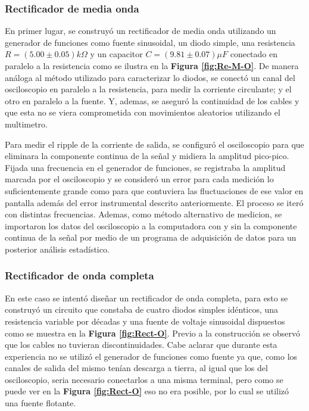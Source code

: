 \documentclass[11pt,a4paper]{article}
\begin{document}
\subsubsection{Rectificador de media onda}
En primer lugar, se construyó un rectificador de media onda utilizando un generador de funciones como fuente sinusoidal, un diodo simple, una resistencia $R = (5.00 \pm 0.05)k\Omega$ y un capacitor $C = (9.81 \pm 0.07)\mu F$ conectado en paralelo a la resistencia como se ilustra en la \textbf{Figura \ref{fig:Re-M-O}}. De manera análoga al método utilizado para caracterizar lo diodos, se conectó un canal del osciloscopio en paralelo a la resistencia, para medir la corriente circulante; y el otro en paralelo a la fuente. Y, ademas, se aseguró la continuidad de los cables y que esta no se viera comprometida con movimientos aleatorios utilizando el multimetro.

Para medir el ripple de la corriente de salida, se configuró el osciloscopio para que eliminara la componente continua de la señal y midiera la amplitud pico-pico. Fijada una frecuencia en el generador de funciones, se registraba la amplitud marcada por el osciloscopio y se consideró un error para cada medición lo suficientemente grande como para que contuviera las fluctuaciones de ese valor en pantalla además del error instrumental descrito anteriormente. El proceso se iteró con distintas frecuencias.  Ademas, como método alternativo de medicion, se importaron los datos del osciloscopio a la computadora con y sin la componente continua de la señal por medio de un programa de adquisición de datos para un posterior análisis estadístico.

\subsubsection{Rectificador de onda completa}
En este caso se intentó diseñar un rectificador de onda completa, para esto se construyó un circuito que constaba de cuatro diodos simples idénticos, una resistencia variable por décadas y una fuente de voltaje sinusoidal dispuestos como se muestra en la \textbf{Figura \ref{fig:Rect-O}}. Previo a la construcción se observó que los cables no tuvieran discontinuidades. Cabe aclarar que durante esta experiencia no se utilizó el generador de funciones como fuente ya que, como los canales de salida del mismo tenían descarga a tierra, al igual que los del osciloscopio, seria necesario conectarlos a una misma terminal, pero como se puede ver en la \textbf{Figura \ref{fig:Rect-O}} eso no era posible, por lo cual se utilizó una fuente flotante. 
\end{document}

